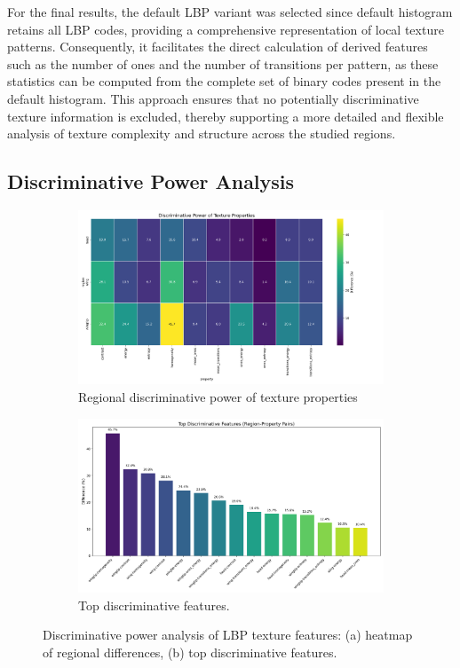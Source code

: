 \documentclass[a4paper,12pt]{report}
\begin{document}
For the final results, the default LBP variant was selected since default histogram retains all LBP codes, providing a comprehensive representation of local texture patterns. Consequently, it facilitates the direct calculation of derived features such as the number of ones and the number of transitions per pattern, as these statistics can be computed from the complete set of binary codes present in the default histogram. This approach ensures that no potentially discriminative texture information is excluded, thereby supporting a more detailed and flexible analysis of texture complexity and structure across the studied regions.

\subsection{Discriminative Power Analysis}
\begin{figure}[H]
    \centering
    \begin{subfigure}[b]{0.48\textwidth}
        \centering
        \includegraphics[width=\textwidth]{images/LBP/discriminative_power_heatmap.png}
        \caption{Regional discriminative power of texture properties}
        \label{fig:heatmap}
    \end{subfigure}
    \hfill
    \begin{subfigure}[b]{0.48\textwidth}
        \centering
        \includegraphics[width=\textwidth]{images/LBP/top_discriminative_features.png}
        \caption{Top discriminative features.}
        \label{fig:top_features}
    \end{subfigure}
    \caption{Discriminative power analysis of LBP texture features: (a) heatmap of regional differences, (b) top discriminative features.}
    \label{fig:lbp_discriminative_power}
\end{figure}
\end{document}

